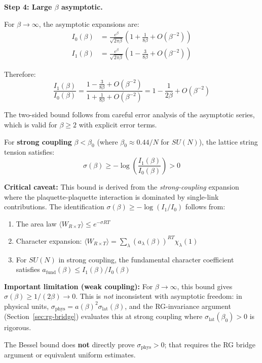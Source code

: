 \textbf{Step 4: Large $\beta$ asymptotic.}

For $\beta \to \infty$, the asymptotic expansions are:
\begin{align}
I_0(\beta) &= \frac{e^\beta}{\sqrt{2\pi\beta}}\left(1 + \frac{1}{8\beta} + O(\beta^{-2})\right) \\
I_1(\beta) &= \frac{e^\beta}{\sqrt{2\pi\beta}}\left(1 - \frac{3}{8\beta} + O(\beta^{-2})\right)
\end{align}

Therefore:
\begin{equation}
\frac{I_1(\beta)}{I_0(\beta)} = \frac{1 - \frac{3}{8\beta} + O(\beta^{-2})}
{1 + \frac{1}{8\beta} + O(\beta^{-2})} 
= 1 - \frac{1}{2\beta} + O(\beta^{-2})
\end{equation}

The two-sided bound follows from careful error analysis of the asymptotic series, 
which is valid for $\beta \geq 2$ with explicit error terms.

\begin{corollary}
\label{cor:sigma-bessel-bound}
For \textbf{strong coupling} $\beta < \beta_0$ (where $\beta_0 \approx 0.44/N$ for $SU(N)$), 
the lattice string tension satisfies:
\begin{equation}
\sigma(\beta) \geq -\log\left(\frac{I_1(\beta)}{I_0(\beta)}\right) > 0
\end{equation}

\textbf{Critical caveat:} This bound is derived from the \emph{strong-coupling} 
expansion where the plaquette-plaquette interaction is dominated by single-link 
contributions. The identification $\sigma(\beta) \geq -\log(I_1/I_0)$ follows from:
\begin{enumerate}
\item The area law $\langle W_{R \times T} \rangle \leq e^{-\sigma R T}$ 
\item Character expansion: $\langle W_{R \times T} \rangle = \sum_\lambda (a_\lambda(\beta))^{RT} \chi_\lambda(1)$
\item For $SU(N)$ in strong coupling, the fundamental character coefficient satisfies 
$a_{\text{fund}}(\beta) \leq I_1(\beta)/I_0(\beta)$
\end{enumerate}

\textbf{Important limitation (weak coupling):} For $\beta \to \infty$, this bound gives 
$\sigma(\beta) \geq 1/(2\beta) \to 0$. This is \emph{not} inconsistent with asymptotic 
freedom: in physical units, $\sigma_{\text{phys}} = a(\beta)^2 \sigma_{\text{lat}}(\beta)$, 
and the RG-invariance argument (Section~\ref{sec:rg-bridge}) evaluates this at strong 
coupling where $\sigma_{\text{lat}}(\beta_0) > 0$ is rigorous.

The Bessel bound does \textbf{not} directly prove $\sigma_{\text{phys}} > 0$; that 
requires the RG bridge argument or equivalent uniform estimates.
\end{corollary}

